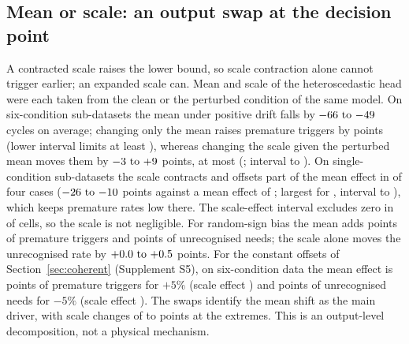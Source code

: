 \subsection{Mean or scale: an output swap at the decision point}\label{sec:swap}
A contracted scale raises the lower bound, so scale contraction alone cannot trigger earlier; an expanded scale can. Mean and scale of the heteroscedastic head were each taken from the clean or the perturbed condition of the same model. On six-condition sub-datasets the mean under positive drift falls by $\JMuShiftDrift$ cycles on average; changing only the mean raises premature triggers by \JSwapMuDrift{} points (lower interval limits at least \JSwapMuDriftLoCI{}), whereas changing the scale given the perturbed mean moves them by $\JSwapSigDrift$ points, at most \JSigExtMaxPt{} (\JSigExtMaxCell; interval \JSigExtMaxLo{} to \JSigExtMaxHi). On single-condition sub-datasets the scale contracts and offsets part of the mean effect in \JSwapSigDriftSingleN{} of four cases ($\JSwapSigDriftSingle$ points against a mean effect of \JSwapMuDriftSingle{}; largest \JSigExtMinPt{} for \JSigExtMinCell, interval \JSigExtMinLo{} to \JSigExtMinHi), which keeps premature rates low there. The scale-effect interval excludes zero in \JSigExtExclZero{} of \JSigExtCells{} cells, so the scale is not negligible. For random-sign bias the mean adds \JSwapMuBias{} points of premature triggers and \JSwapMuBiasUnrec{} points of unrecognised needs; the scale alone moves the unrecognised rate by $\JSwapSigBiasUnrec$ points. For the constant offsets of Section~\ref{sec:coherent} (Supplement S5), on six-condition data the mean effect is \JCPswapMuPrem{} points of premature triggers for $+5\%$ (scale effect \JCPswapSigPrem) and \JCNswapMuUnrec{} points of unrecognised needs for $-5\%$ (scale effect \JCNswapSigUnrec). The swaps identify the mean shift as the main driver, with scale changes of \JSigExtMinPt{} to \JSigExtMaxPt{} points at the extremes. This is an output-level decomposition, not a physical mechanism.

